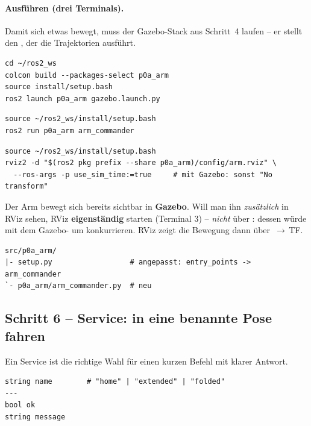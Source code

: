 \paragraph{Ausführen (drei Terminals).} Damit sich etwas bewegt, muss der
Gazebo-Stack aus Schritt~4 laufen -- er stellt den , der
die Trajektorien ausführt.
\begin{lstlisting}[style=bash,caption={Terminal 1 -- Gazebo-Stack (wie Schritt 4)}]
cd ~/ros2_ws
colcon build --packages-select p0a_arm
source install/setup.bash
ros2 launch p0a_arm gazebo.launch.py
\end{lstlisting}
\begin{lstlisting}[style=bash,caption={Terminal 2 -- den Knoten starten}]
source ~/ros2_ws/install/setup.bash
ros2 run p0a_arm arm_commander
\end{lstlisting}
\begin{lstlisting}[style=bash,caption={Terminal 3 (optional) -- RViz eigenständig}]
source ~/ros2_ws/install/setup.bash
rviz2 -d "$(ros2 pkg prefix --share p0a_arm)/config/arm.rviz" \
  --ros-args -p use_sim_time:=true     # mit Gazebo: sonst "No transform"
\end{lstlisting}

\begin{warnbox}[title={RViz neben Gazebo -- nicht über display.launch.py}]
Der Arm bewegt sich bereits sichtbar in \textbf{Gazebo}. Will man ihn
\emph{zusätzlich} in RViz sehen, RViz \textbf{eigenständig} starten (Terminal 3)
-- \emph{nicht} über \code{display.launch.py}: dessen
 würde mit dem Gazebo-%
 um  konkurrieren. RViz
zeigt die Bewegung dann über \code{/joint\_states}\,$\rightarrow$\,TF.
\end{warnbox}
\begin{lstlisting}[style=bash,caption={\code{ros2\_ws}-Delta nach Schritt 5 (\# neu / \# angepasst)}]
src/p0a_arm/
|- setup.py                  # angepasst: entry_points -> arm_commander
`- p0a_arm/arm_commander.py  # neu
\end{lstlisting}

\subsection{Schritt 6 -- Service: in eine benannte Pose fahren}
Ein Service ist die richtige Wahl für einen kurzen Befehl mit klarer Antwort.
\begin{lstlisting}[style=bash,caption={\code{srv/SetNamedPose.srv}}]
string name        # "home" | "extended" | "folded"
---
bool ok
string message
\end{lstlisting}
